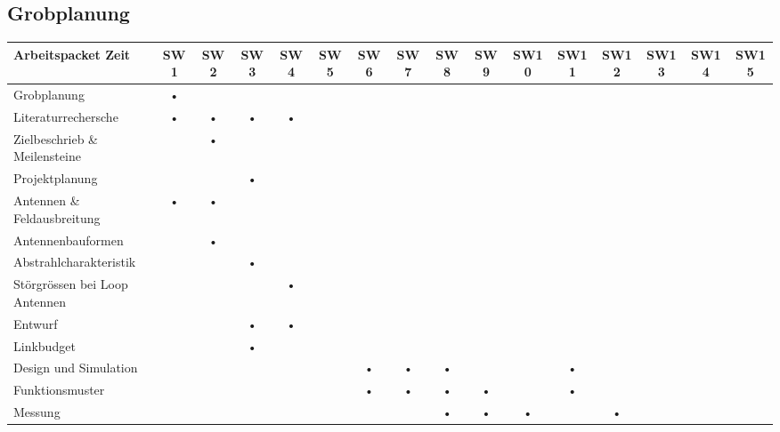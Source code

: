 \begin{landscape}
\section{Grobplanung}
\begin{longtable}{l|c|c|c|c|c|c|c|c|c|c|c|c|c|c|c}%
\hline 
Arbeitspacket Zeit & SW1 & SW2 & SW3 & SW4 & SW5 & SW6 & SW7 & SW8 & SW9 & SW10 & SW11 & SW12 & SW13 & SW14 & SW15   \\ %
\hline 
\hline 


Grobplanung & \cellcolor{gray!50}• &  &  &  &  &  &  &  &  &  &  &  &  &  & \\  
\hline 
Literaturrechersche & \cellcolor{gray!50}• & \cellcolor{gray!50}•  & \cellcolor{gray!50}• & \cellcolor{gray!50}•  &  &  &  &  &  &  &  &  &  & &\\ 
\hline 
Zielbeschrieb \& Meilensteine &  & \cellcolor{gray!50}• &  &  &  &  &  &  &  &  &  &  & & &\\
\hline
Projektplanung  &  &  & \cellcolor{gray!50}•  &  &  &  &  &  &  &  &  &  & & &\\ 
\hline 
Antennen \& Feldausbreitung & \cellcolor{gray!50}• & \cellcolor{gray!50}• &  &  &  &  &  &  &  &  &  &  &  & &\\ 
\hline 
Antennenbauformen &  & \cellcolor{gray!50}• &  &  &  &  &  &  &  &  &  &  &  &    &\\ 
\hline 
Abstrahlcharakteristik &  &  & \cellcolor{gray!50}• &  &  &  &  &  &  &  &  &  &  & &\\ 
\hline 
Störgrössen bei Loop Antennen &  &  &  & \cellcolor{gray!50}• & &  &  &  &  & &  &  &  & &\\ 
\hline 
Entwurf &  &  & \cellcolor{gray!50}• & \cellcolor{gray!50}• &  &  &  &  & &  &  &  &  & \\ 
\hline 
Linkbudget &  &  & \cellcolor{gray!50}• &  &  &  &  &  &  &  &  &  &  &\\ 
\hline 
Design und Simulation &  &  &  &  &  & \cellcolor{gray!50}• & \cellcolor{gray!50}• & \cellcolor{gray!50}• &  &  & \cellcolor{gray!50}• &  & & \\ 
\hline 
Funktionsmuster &  &  &  &  &  & \cellcolor{gray!50}• & \cellcolor{gray!50}• & \cellcolor{gray!50}• & \cellcolor{gray!50}• &  & \cellcolor{gray!50}• &  & & \\ 
\hline 
Messung  &  &  &  &  &  &  &  & \cellcolor{gray!50}• & \cellcolor{gray!50}• & \cellcolor{gray!50}• &  & \cellcolor{gray!50}• &  &  &  \\ 

\end{longtable}
\end{landscape}
